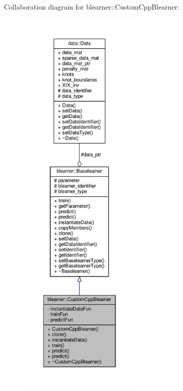 Collaboration diagram for blearner\+:\+:Custom\+Cpp\+Blearner\+:
\nopagebreak
\begin{figure}[H]
\begin{center}
\leavevmode
\includegraphics[height=550pt]{classblearner_1_1_custom_cpp_blearner__coll__graph}
\end{center}
\end{figure}
